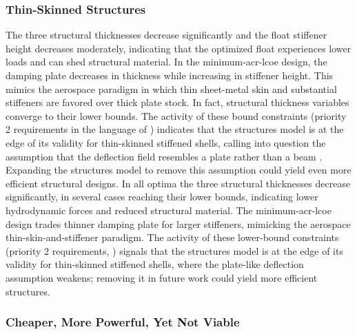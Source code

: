 \subsubsection{Thin-Skinned Structures}
\ifdefined\DISSERTATION
    The three structural thicknesses decrease significantly and the float stiffener height decreases moderately, indicating that the optimized float experiences lower loads and can shed structural material.
    In the minimum-\gls{acr-lcoe} design, the damping plate decreases in thickness while increasing in stiffener height.
    This mimics the aerospace paradigm in which thin sheet-metal skin and substantial stiffeners are favored over thick plate stock.
    In fact, structural thickness variables converge to their lower bounds.
    The activity of these bound constraints (priority 2 requirements in the language of ) indicates that the structures model is at the edge of its validity for thin-skinned stiffened shells, calling into question the assumption that the deflection field resembles a plate rather than a beam \citep{mccabe_development_2026}.
    Expanding the structures model to remove this assumption could yield even more efficient structural designs.
\else
    In all optima the three structural thicknesses decrease significantly, in several cases reaching their lower bounds, indicating lower hydrodynamic forces and reduced structural material.
    The minimum-\gls{acr-lcoe} design trades thinner damping plate for larger stiffeners, mimicking the aerospace thin-skin-and-stiffener paradigm.
    The activity of these lower-bound constraints
    (priority 2 requirements, )
    signals that the structures model is at the edge of its validity for thin-skinned stiffened shells, where the plate-like deflection assumption \citep{mccabe_development_2026} weakens;
    removing it in future work could yield more efficient structures.
\fi

\subsubsection{Cheaper, More Powerful, Yet Not Viable}

